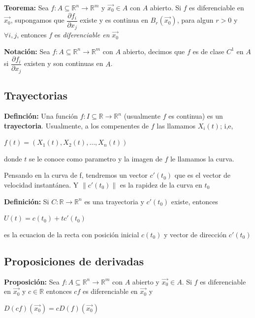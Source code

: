 \documentclass[12pt]{article}
\begin{document}
\noindent \textbf{Teorema: }Sea $f:A\subseteq\mathbb{R}^n\rightarrow\mathbb{R}^m$ y $\vec{x_0}\in A$ con $A$ abierto. Si $f$ es diferenciable en $\vec{x_0}$, supongamos que 
$\dfrac{\partial{f_i}}{\partial{x_j}}$ existe y es continua en $B_{r}(\vec{x_0})$, para algun $r>0$ y $\forall i,j$, entonces $f$ es \emph{diferenciable en} $\vec{x_0}$

\noindent \textbf{Notación: }Sea $f:A\subseteq\mathbb{R}^n\rightarrow\mathbb{R}^m$ con $A$ abierto, decimos que $f$ es de clase $C^{1}$ en $A$ si $\dfrac{\partial{f_i}}{\partial{x_j}}$ existen y son continuas en $A$.\newline

\subsection*{Trayectorias} 

\noindent \textbf{Definción: }Una función $f:I\subseteq\mathbb{R}\rightarrow \mathbb{R}^n$ (usualmente  $f$ es continua) es un \textbf{trayectoria}. Usualmente, a los compenentes de $f$ las llamamos
$X_i(t)$; i,e,
\begin{center}
    $f(t)=(X_1 (t),X_2 (t),\dots,X_n (t))$
\end{center}
\noindent donde $t$ se le conoce como parametro y la imagen de $f$ le llamamos la curva. 

\noindent Pensando en la curva de f, tendremos un vector $c'(t_0)$ que es el vector de velocidad instantánea. Y
$\|c'(t_0)\|$ es la rapidez de la curva en $t_0$

\noindent \textbf{Definición:} Si $C:\mathbb{R}\rightarrow\mathbb{R}^n$ es una trayectoria y $c'(t_0)$ existe, entonces
\begin{center}
    $U(t)=c(t_0)+tc'(t_0)$
\end{center}
es la ecuacion de la recta con posición inicial $c(t_0)$ y vector de dirección $c'(t_0)$

\subsection*{Proposiciones de derivadas} 
\noindent \textbf{Proposición:} Sea $f:A\subseteq\mathbb{R}^n\rightarrow\mathbb{R}^m$ con $A$ abierto y $\vec{x_0}\in A$. Si $f$ es diferenciable en 
$\vec{x_0}$ y $c\in\mathbb{R}$ entonces $cf$ es diferenciable en $\vec{x_0}$ y 
\begin{center}
    $D(cf)(\vec{x_0})=cD(f)(\vec{x_0})$
\end{center}
\end{document}
